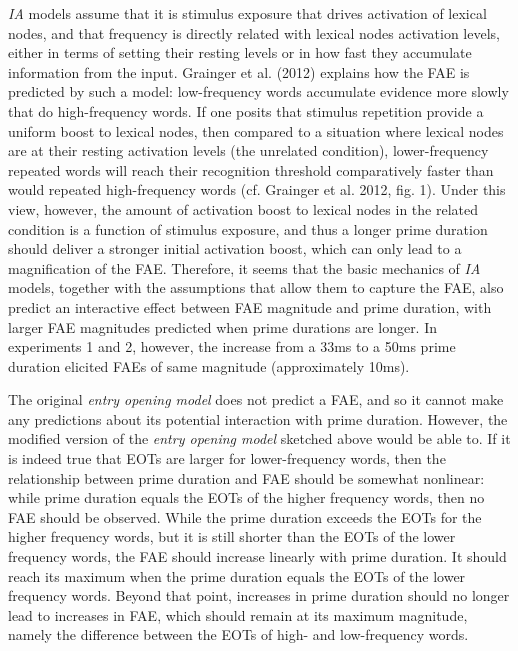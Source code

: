\documentclass[
]{interact}
\begin{document}
\emph{IA} models assume that it is stimulus exposure that drives
activation of lexical nodes, and that frequency is directly related with
lexical nodes activation levels, either in terms of setting their
resting levels or in how fast they accumulate information from the
input. Grainger et al. (2012) explains how the FAE is predicted by such
a model: low-frequency words accumulate evidence more slowly that do
high-frequency words. If one posits that stimulus repetition provide a
uniform boost to lexical nodes, then compared to a situation where
lexical nodes are at their resting activation levels (the unrelated
condition), lower-frequency repeated words will reach their recognition
threshold comparatively faster than would repeated high-frequency words
(cf. Grainger et al. 2012, fig. 1). Under this view, however, the amount
of activation boost to lexical nodes in the related condition is a
function of stimulus exposure, and thus a longer prime duration should
deliver a stronger initial activation boost, which can only lead to a
magnification of the FAE. Therefore, it seems that the basic mechanics
of \emph{IA} models, together with the assumptions that allow them to
capture the FAE, also predict an interactive effect between FAE
magnitude and prime duration, with larger FAE magnitudes predicted when
prime durations are longer. In experiments 1 and 2, however, the
increase from a 33ms to a 50ms prime duration elicited FAEs of same
magnitude (approximately 10ms).

The original \emph{entry opening model} does not predict a FAE, and so
it cannot make any predictions about its potential interaction with
prime duration. However, the modified version of the \emph{entry opening
model} sketched above would be able to. If it is indeed true that EOTs
are larger for lower-frequency words, then the relationship between
prime duration and FAE should be somewhat nonlinear: while prime
duration equals the EOTs of the higher frequency words, then no FAE
should be observed. While the prime duration exceeds the EOTs for the
higher frequency words, but it is still shorter than the EOTs of the
lower frequency words, the FAE should increase linearly with prime
duration. It should reach its maximum when the prime duration equals the
EOTs of the lower frequency words. Beyond that point, increases in prime
duration should no longer lead to increases in FAE, which should remain
at its maximum magnitude, namely the difference between the EOTs of
high- and low-frequency words.
\end{document}

